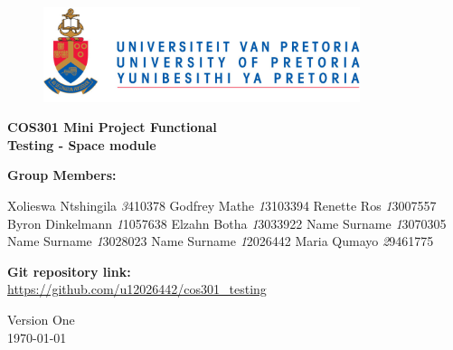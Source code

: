 \begin{titlepage}
	\begin{center}
		
		\begin{figure}[t]
			\centering
			\includegraphics[width=350px]{UP_Logo.png}
		\end{figure}		
		
		\textbf{\LARGE COS301 Mini Project Functional \\Testing - Space module\\}
		
		\vspace{1 cm}
		
		\LARGE{\textbf{Group Members: }}
		

		\begin{flushright} \large
			Xolieswa Ntshingila \emph3410378\newline
			Godfrey Mathe \emph13103394 \newline
			Renette Ros \emph13007557\newline
			Byron Dinkelmann \emph11057638\newline
			Elzahn Botha \emph13033922\newline
			Name Surname \emph13070305\newline
			Name Surname \emph13028023\newline
			Name Surname \emph12026442\newline
			Maria Qumayo \emph29461775\newline
		\end{flushright}
		
	
		
		\textbf{Git repository link:\\}
		 \url{ https://github.com/u12026442/cos301_testing}
		
		\vfill
		
		{\LARGE Version One}
		\\
		{\large \today}		
		
		
	\end{center}
\end{titlepage}
